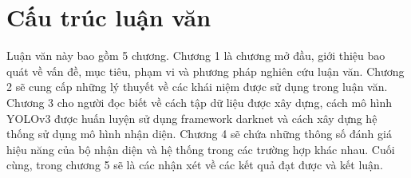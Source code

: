 \section{Cấu trúc luận văn}
Luận văn này bao gồm 5 chương. Chương 1 là chương mở đầu, giới thiệu bao quát về vấn đề, mục tiêu, phạm vi và phương pháp nghiên cứu luận văn. Chương 2 sẽ cung cấp những lý thuyết về các khái niệm được sử dụng trong luận văn. Chương 3 cho người đọc biết về cách tập dữ liệu được xây dựng, cách mô hình YOLOv3 được huấn luyện sử dụng framework darknet và cách xây dựng hệ thống sử dụng mô hình nhận diện. Chương 4 sẽ chứa những thông số đánh giá hiệu năng của bộ nhận diện và hệ thống trong các trường hợp khác nhau. Cuối cùng, trong chương 5 sẽ là các nhận xét về các kết quả đạt được và kết luận.